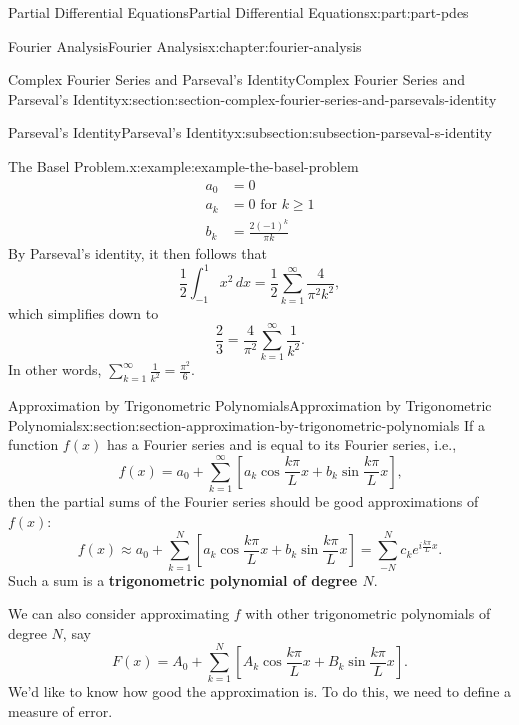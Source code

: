 \documentclass[twoside,10pt,]{book}
\newcommand{\terminology}[1]{\textbf{#1}}
\numberwithin{equation}{part}
\newcommand{\amp}{&}
\begin{document}
\begin{partptx}{Partial Differential Equations}{}{Partial Differential Equations}{}{}{x:part:part-pdes}
\begin{chapterptx}{Fourier Analysis}{}{Fourier Analysis}{}{}{x:chapter:fourier-analysis}
\begin{sectionptx}{Complex Fourier Series and Parseval's Identity}{}{Complex Fourier Series and Parseval's Identity}{}{}{x:section:section-complex-fourier-series-and-parsevals-identity}
\begin{subsectionptx}{Parseval's Identity}{}{Parseval's Identity}{}{}{x:subsection:subsection-parseval-s-identity}
\begin{example}{The Basel Problem.}{x:example:example-the-basel-problem}
\begin{align*}
a_{0} \amp = 0 \\
a_{k} \amp = 0 \text{ for } k\geq 1 \\
b_{k} \amp = \frac{2(-1)^{k}}{\pi k} 
\end{align*}
By Parseval's identity, it then follows that%
\begin{equation*}
\frac{1}{2}\int_{-1}^{1}x^{2}\,dx = \frac{1}{2}\sum_{k=1}^{\infty}\frac{4}{\pi^{2}k^{2}},
\end{equation*}
which simplifies down to%
\begin{equation*}
\frac{2}{3} = \frac{4}{\pi^{2}}\sum_{k=1}^{\infty}\frac{1}{k^{2}}.
\end{equation*}
In other words, \(\sum_{k=1}^{\infty}\frac{1}{k^{2}} = \frac{\pi^{2}}{6}.\)%
\end{example}
%
\end{subsectionptx}
\end{sectionptx}
%
%
\typeout{************************************************}
\typeout{************************************************}
%
\begin{sectionptx}{Approximation by Trigonometric Polynomials}{}{Approximation by Trigonometric Polynomials}{}{}{x:section:section-approximation-by-trigonometric-polynomials}
If a function \(f(x)\) has a Fourier series and is equal to its Fourier series, i.e.,%
\begin{equation*}
f(x) = a_{0} + \sum_{k=1}^{\infty}[a_{k}\cos\frac{k\pi}{L}x + b_{k}\sin\frac{k\pi}{L}x]\text{,}
\end{equation*}
then the partial sums of the Fourier series should be good approximations of \(f(x)\):%
\begin{equation*}
f(x) \approx a_{0} + \sum_{k=1}^{N}[a_{k}\cos\frac{k\pi}{L}x + b_{k}\sin\frac{k\pi}{L}x] = \sum_{-N}^{N}c_{k}e^{i\frac{k\pi}{L}x}\text{.}
\end{equation*}
Such a sum is a \terminology{trigonometric polynomial of degree \(N\)}.%
\par
We can also consider approximating \(f\) with other trigonometric polynomials of degree \(N\), say%
\begin{equation*}
F(x) = A_{0} + \sum_{k=1}^{N}[A_{k}\cos\frac{k\pi}{L}x + B_{k}\sin\frac{k\pi}{L}x]\text{.}
\end{equation*}
We'd like to know how good the approximation is. To do this, we need to define a measure of error.%

\end{sectionptx}
\end{chapterptx}
\end{partptx}
\end{document}
